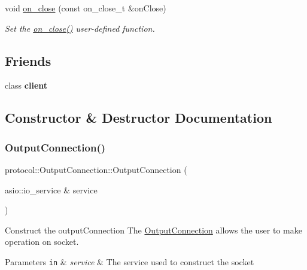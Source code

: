 \begin{DoxyCompactItemize}
void \hyperlink{classprotocol_1_1_output_connection_a6e16ce905582f9cbab7b442e9629d268}{on\+\_\+close} (const on\+\_\+close\+\_\+t \&on\+Close)
\begin{DoxyCompactList}\small\item\em Set the \hyperlink{classprotocol_1_1_output_connection_a6e16ce905582f9cbab7b442e9629d268}{on\+\_\+close()} user-\/defined function. \end{DoxyCompactList}\end{DoxyCompactItemize}
\subsection*{Friends}
\begin{DoxyCompactItemize}
\item 
\mbox{\label{classprotocol_1_1_output_connection_a82afbffb52dc3f25e56edfe10f7d286a}} 
class {\bfseries client}
\end{DoxyCompactItemize}


\subsection{Constructor \& Destructor Documentation}
\mbox{\label{classprotocol_1_1_output_connection_a61ed3f73d4513e1616753ea59f193e1e}} 
\subsubsection{\texorpdfstring{Output\+Connection()}{OutputConnection()}}
{\footnotesize\ttfamily protocol\+::\+Output\+Connection\+::\+Output\+Connection (\begin{DoxyParamCaption}\item[{asio\+::io\+\_\+service \&}]{service }\end{DoxyParamCaption})}



Construct the output\+Connection The \hyperlink{classprotocol_1_1_output_connection}{Output\+Connection} allows the user to make operation on socket. 


\begin{DoxyParams}[1]{Parameters}
\mbox{\tt in}  & {\em service} & The service used to construct the socket \\
\hline
\end{DoxyParams}


